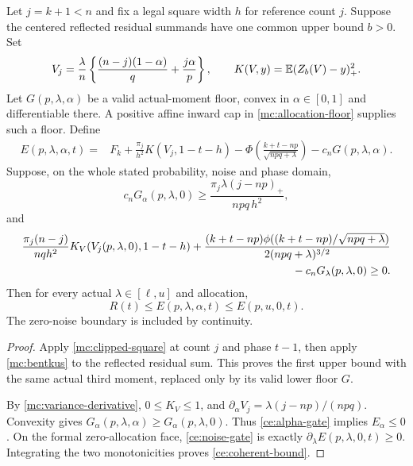 \begin{proposition}\label{ce:coherent}
Let $j=k+1<n$ and fix a legal square width $h$ for reference count $j$.
Suppose the centered reflected residual summands have one common upper
bound $b>0$. Set
\[
 V_j=\frac\lambda n\left\{\frac{(n-j)(1-\alpha)}q+\frac{j\alpha}p\right\},
 \qquad K(V,y)=\mathbb E(Z_b(V)-y)_+^2.
\]
Let $G(p,\lambda,\alpha)$ be a valid actual-moment floor, convex in
$\alpha\in[0,1]$ and differentiable there. A positive affine inward
cap in \eqref{mc:allocation-floor} supplies such a floor.
Define
\begin{align}\label{ce:coherent-price}
 E(p,\lambda,\alpha,t)={}&F_k+
     \frac{\pi_j}{h^2}K(V_j,1-t-h)
 -\Phi\left(\frac{k+t-np}{\sqrt{npq+\lambda}}\right)
 -c_nG(p,\lambda,\alpha).
\end{align}
Suppose, on the whole stated probability, noise and phase domain,
\begin{equation}\label{ce:alpha-gate}
 c_nG_\alpha(p,\lambda,0)
 \ge\frac{\pi_j\lambda(j-np)_+}{npq\,h^2},
\end{equation}
and
\begin{align}\label{ce:noise-gate}
 \frac{\pi_j(n-j)}{nq h^2}K_V(V_j(p,\lambda,0),1-t-h)
 +\frac{(k+t-np)\phi((k+t-np)/\sqrt{npq+\lambda})}
                  {2(npq+\lambda)^{3/2}}\notag\\
  {}-c_nG_\lambda(p,\lambda,0)\ge0.
\end{align}
Then for every actual $\lambda\in[\ell,u]$ and allocation,
\begin{equation}\label{ce:coherent-bound}
 R(t)\le E(p,\lambda,\alpha,t)\le E(p,u,0,t).
\end{equation}
The zero-noise boundary is included by continuity.
\end{proposition}
\begin{proof}
Apply \eqref{mc:clipped-square} at count $j$ and phase $t-1$,
then apply \eqref{mc:bentkus} to the reflected residual sum.
This proves the first upper bound with the same actual third moment,
replaced only by its valid lower floor $G$.

By \eqref{mc:variance-derivative}, $0\le K_V\le1$, and
$\partial_\alpha V_j=\lambda(j-np)/(npq)$.
Convexity gives $G_\alpha(p,\lambda,\alpha)\ge G_\alpha(p,\lambda,0)$.
Thus \eqref{ce:alpha-gate} implies $E_\alpha\le0$.
On the formal zero-allocation face, \eqref{ce:noise-gate} is exactly
$\partial_\lambda E(p,\lambda,0,t)\ge0$. Integrating the two
monotonicities proves \eqref{ce:coherent-bound}.
\end{proof}

